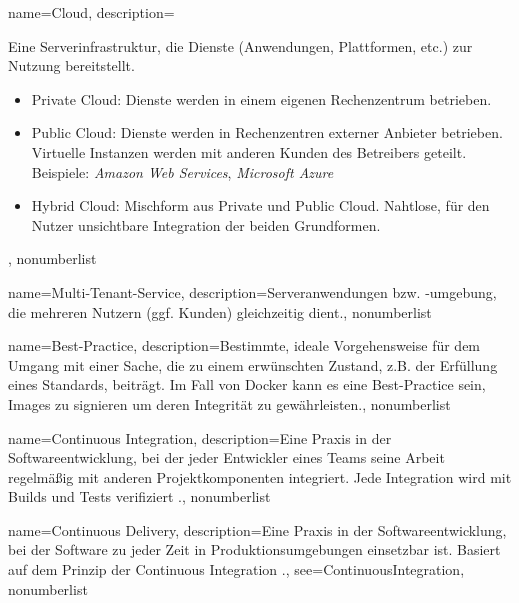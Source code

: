 



{%
  name={Cloud},
  description={Eine Serverinfrastruktur, die Dienste (Anwendungen, Plattformen, etc.) zur Nutzung bereitstellt.
    \begin{itemize}
      \item Private Cloud: Dienste werden in einem eigenen Rechenzentrum betrieben.
      \item Public Cloud: Dienste werden in Rechenzentren externer Anbieter betrieben. Virtuelle Instanzen werden mit anderen Kunden des Betreibers geteilt. Beispiele: \emph{Amazon Web Services}, \emph{Microsoft Azure}
      \item Hybrid Cloud: Mischform aus Private und Public Cloud. Nahtlose, für den Nutzer unsichtbare Integration der beiden Grundformen.
    \end{itemize}},
  nonumberlist
}

{%
  name={Multi-Tenant-Service},
  description={Serveranwendungen bzw. -umgebung, die mehreren Nutzern (ggf. Kunden) gleichzeitig dient.},
  nonumberlist
}

{%
  name={Best-Practice},
  description={Bestimmte, ideale Vorgehensweise für dem Umgang mit einer Sache, die zu einem erwünschten Zustand, z.B. der Erfüllung eines Standards, beiträgt. Im Fall von Docker kann es eine Best-Practice sein, Images zu signieren um deren Integrität zu gewährleisten.},
  nonumberlist
}

{%
  name={Continuous Integration},
  description={Eine Praxis in der Softwareentwicklung, bei der jeder Entwickler eines Teams seine Arbeit regelmäßig mit anderen Projektkomponenten integriert. Jede Integration wird mit Builds und Tests verifiziert \cite{ci}.},
  nonumberlist
}

{%
  name={Continuous Delivery},
  description={Eine Praxis in der Softwareentwicklung, bei der Software zu jeder Zeit in Produktionsumgebungen einsetzbar ist. Basiert auf dem Prinzip der Continuous Integration \cite{cd}.},
  see={ContinuousIntegration},
  nonumberlist
}

